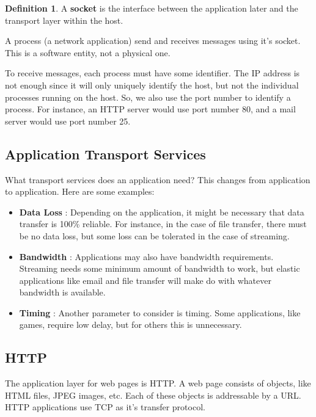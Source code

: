 \documentclass[12pt,letterpaper]{article}
\theoremstyle{definition}
\newtheorem{definition}{Definition}[section] %
\begin{document}
\begin{definition}
  A \textbf{socket} is the interface between the application later and the transport layer within the host.  
\end{definition}

A process (a network application) send and receives messages using it's socket. This is a software entity, not a physical one.

To receive messages, each process must have some identifier. The IP address is not enough since it will only uniquely identify the host, but not the individual processes running on the host. So, we also use the port number to identify a process. For instance, an HTTP server would use port number 80, and a mail server would use port number 25.

\subsection{Application Transport Services}

What transport services does an application need? This changes from application to application. Here are some examples:

\begin{itemize}
  \item \textbf{Data Loss} : Depending on the application, it might be necessary that data transfer is 100\% reliable. For instance, in the case of file transfer, there must be no data loss, but some loss can be tolerated in the case of streaming.
  \item \textbf{Bandwidth} : Applications may also have bandwidth requirements. Streaming needs some minimum amount of bandwidth to work, but elastic applications like email and file transfer will make do with whatever bandwidth is available.
  \item \textbf{Timing} : Another parameter to consider is timing. Some applications, like games, require low delay, but for others this is unnecessary.
\end{itemize}

\subsection{HTTP}

The application layer for web pages is HTTP. A web page consists of objects, like HTML files, JPEG images, etc. Each of these objects is addressable by a URL. HTTP applications use TCP as it's transfer protocol. 
\end{document}
